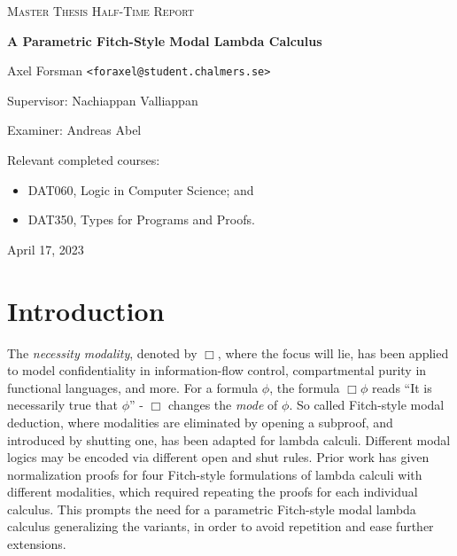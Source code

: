 \documentclass{article}
\theoremstyle{definition}\newtheorem{definition}{Definition}
\begin{document}
\begin{titlepage}\centering

{\scshape\LARGE Master Thesis Half-Time Report\\}

\vspace{0.5cm}

{\huge\bfseries A Parametric Fitch-Style Modal Lambda Calculus\\}

\vspace{2cm}

{\Large Axel Forsman \texttt{<foraxel@student.chalmers.se>} \\}

\vspace{1.0cm}

{\large Supervisor: Nachiappan Valliappan \\}

\vspace{1.0cm}

{\large Examiner: Andreas Abel \\}

\vspace{1.5cm}

{\large Relevant completed courses:\par}

{\itshape \begin{itemize}
  \item DAT060, Logic in Computer Science; and
  \item DAT350, Types for Programs and Proofs.
  \end{itemize}}

\vfill
{\large April 17, 2023 \\}
\end{titlepage}

\section{Introduction}

The \emph{necessity modality}, denoted by $\Box$, where the focus will lie,
has been applied to model confidentiality in information-flow control,
compartmental purity in functional languages,
and more.
For a formula $\phi$, the formula $\Box \phi$ reads
``It is necessarily true that $\phi$'' -
$\Box$ changes the \emph{mode} of $\phi$.
So called Fitch-style modal deduction,
where modalities are eliminated by opening a subproof,
and introduced by shutting one,
has been adapted for lambda calculi.
Different modal logics may be encoded via different open and shut rules.
Prior work \cite{valliappan22} has given normalization proofs
for four Fitch-style formulations of lambda calculi with different modalities,
which required repeating the proofs for each individual calculus.
This prompts the need for a parametric Fitch-style modal lambda calculus
generalizing the variants,
in order to avoid repetition and ease further extensions.
\end{document}
